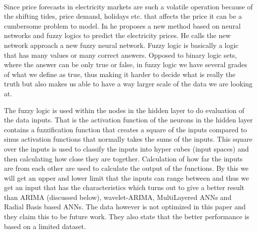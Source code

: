 \\[0.5cm]
Since price forecasts in electricity markets are such a volatile operation because of the shifting tides, price demand, holidays etc. that affects the price it can be a cumbersome problem to model. In \cite{amjady2006day} he proposes a new method based on neural networks and fuzzy logics to predict the electricity prices. He calls the new network approach a new fuzzy neural network. Fuzzy logic is basically a logic that has many values or many correct answers. Opposed to binary logic sets, where the answer can be only true or false, in fuzzy logic we have several grades of what we define as true, thus making it harder to decide what is really the truth but also makes us able to have a way larger scale of the data we are looking at.

The fuzzy logic is used within the nodes in the hidden layer to do evaluation of the data inputs. That is the activation function of the neurons in the hidden layer contains a fuzzification function that creates a square of the inputs compared to sinus activation functions that normally takes the sums of the inputs. This square over the inputs is used to classify the inputs into hyper cubes (input spaces) and then calculating how close they are together. Calculation of how far the inputs are from each other are used to calculate the output of the functions. By this we will get an upper and lower limit that the inputs can range between and thus we get an input that has the characteristics which turns out to give a better result than ARIMA (discussed below), wavelet-ARIMA, MultiLayered ANNs and Radial Basis based ANNs. The data however is not optimized in this paper and they claim this to be future work. They also state that the better performance is based on a limited dataset.